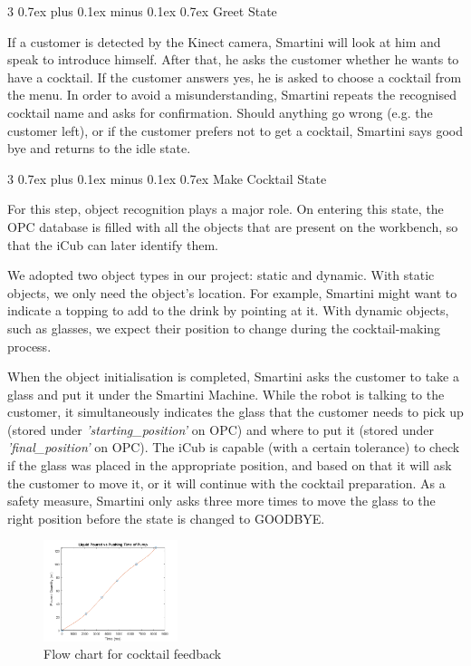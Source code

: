 \documentclass[conference]{IEEEtran}
\makeatletter
\def\subsubsection{\@startsection{subsubsection}%
	{3}%
	{\z@}%
	{0.7ex plus 0.1ex minus 0.1ex}%
	{0.7ex}%
	{\normalfont\normalsize\itshape}}%
\makeatother
\begin{document}
\subsubsection{Greet State}

If a customer is detected by the Kinect camera, Smartini will look at him and speak to introduce himself. After that, he asks the customer whether he wants to have a cocktail. If the customer answers yes, he is asked to choose a cocktail from the menu. In order to avoid a misunderstanding, Smartini repeats the recognised cocktail name and asks for confirmation.
Should anything go wrong (e.g. the customer left), or if the customer prefers not to get a cocktail, Smartini says good bye and returns to the idle state.

\subsubsection{Make Cocktail State}

For this step, object recognition plays a major role. On entering this state, the OPC database is filled with all the objects that are present on the workbench, so that the iCub can later identify them. 

We adopted two object types in our project: static and dynamic. With static objects, we only need the object's location. For example, Smartini might want to indicate a topping to add to the drink by pointing at it. With dynamic objects, such as glasses, we expect their position to change during the cocktail-making process. 

When the object initialisation is completed, Smartini asks the customer to take a glass and put it under the Smartini Machine. While the robot is talking to the customer, it simultaneously indicates the glass that the customer needs to pick up (stored under \textit{'starting\_position'} on OPC) and where to put it (stored under \textit{'final\_position'} on OPC). The iCub is capable (with a certain tolerance) to check if the glass was placed in the appropriate position, and based on that it will ask the customer to move it, or it will continue with the cocktail preparation. As a safety measure, Smartini only asks three more times to move the glass to the right position before the state is changed to GOODBYE.

 \begin{figure}[h]
	\centering
	\includegraphics[width=0.35\textwidth]{figures/interpolation_pumps.png}
	\caption{Flow chart for cocktail feedback}
	\label{fig:interpolation}
\end{figure} 
\end{document}
